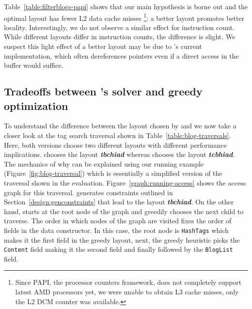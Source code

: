 Table~\ref{table:filterblogs-papi} shows that our main hypothesis is borne out and the optimal layout has fewer
L2 data cache misses%
\footnote{Since PAPI, the processor counters framework, does not completely support latest AMD processors yet, we were unable to obtain L3 cache misses, only the L2 DCM counter was available.}:
a better layout promotes better locality. Interestingly, we do not observe a similar effect for instruction count. While different layouts differ in instruction counts, the difference is slight. We suspect this light effect of a better layout may be due to \gibbon's current implementation, which often dereferences pointers even if a direct access in the buffer would suffice.

\subsection{Tradeoffs between \system's solver and greedy optimization}%
\label{subsec:heuristic-tradeoffs}

To understand the difference between the layout chosen by \systemSolver and \systemGreedy we now take a closer look at the tag search traversal shown in Table~\ref{table:blog-traversals}.
Here, both versions choose two different layouts with different performance implications. \systemSolver chooses the layout \textbf{\textit{tbchiad}} whereas \systemGreedy chooses 
the layout \textbf{\textit{tcbhiad}}. The mechanics of why can be explained using our running example (Figure~\ref{fig:blog-traversal}) which is essentially a simplified version of the 
traversal shown in the evaluation. Figure~\ref{graph:running-access} shows the access graph for this traversal. \systemSolver generates constraints 
outlined in Section~\ref{design:genconstraints} that lead to the layout \textbf{\textit{tbchiad}}. On the other hand, \systemGreedy starts at the root node of the graph and greedily chooses the next child to traverse. 
The order in which nodes of the graph are visited fixes the order of fields in the data constructor. In this case, the root node is \lstinline|HashTags| which makes it the first field in the greedy 
layout, next, the greedy heuristic picks the \lstinline|Content| field making it the second field and finally followed by the \lstinline|BlogList| field.


